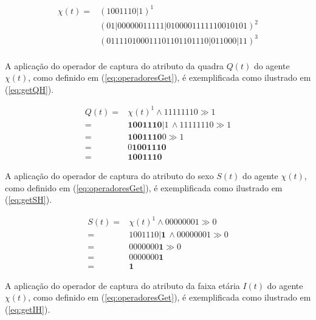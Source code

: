 \begin{equation}
\begin{split}
 \chi(t) =   & (1 0 0 1 1 1 0 | 1)^1 \\
	     & (0 1 | 0 0 0 0 0 0 1 1 1 1 1 | 0 1 0 0 0 0 1 1 1 1 1 1 0 0 1 0 1 0 1)^2 \\
	     & (0 1 1 1 1 0 1 0 0 0 1 1 1 0 1 1 0 1 1 0 1 1 1 0 | 0 1 1 0 0 0 | 1 1)^3 \\
 \label{eq:Exemplo1}
\end{split}
\end{equation}

A aplicação do operador de captura do atributo da quadra $Q(t)$ do agente $\chi(t)$, como definido em (\ref{eq:operadoresGet}), é exemplificada como ilustrado em (\ref{eq:getQH}).

\begin{equation}
 \begin{split}
 Q(t) = & \chi(t)^1 \wedge 11111110 \gg 1 \\
      = & \boldsymbol{1 0 0 1 1 1 0} | 1 \, \wedge 11111110 \gg 1 \\
      = & \boldsymbol{1 0 0 1 1 1 0} 0 \gg 1 \\
      = & 0 \boldsymbol{1 0 0 1 1 1 0} \\
      = & \boldsymbol{1 0 0 1 1 1 0}
 \label{eq:getQH}
 \end{split}
\end{equation}

A aplicação do operador de captura do atributo do sexo $S(t)$ do agente $\chi(t)$, como definido em (\ref{eq:operadoresGet}), é exemplificada como ilustrado em (\ref{eq:getSH}).

\begin{equation}
 \begin{split}
 S(t) = & \chi(t)^1 \wedge 00000001 \gg 0 \\
      = & 1 0 0 1 1 1 0 | \boldsymbol{1} \, \wedge 00000001 \gg 0 \\
      = & 0 0 0 0 0 0 0 \boldsymbol{1} \gg 0 \\
      = & 0 0 0 0 0 0 0 \boldsymbol{1} \\
      = & \boldsymbol{1}
 \label{eq:getSH}
 \end{split}
\end{equation}

A aplicação do operador de captura do atributo da faixa etária $I(t)$ do agente $\chi(t)$, como definido em (\ref{eq:operadoresGet}), é exemplificada como ilustrado em (\ref{eq:getIH}).

